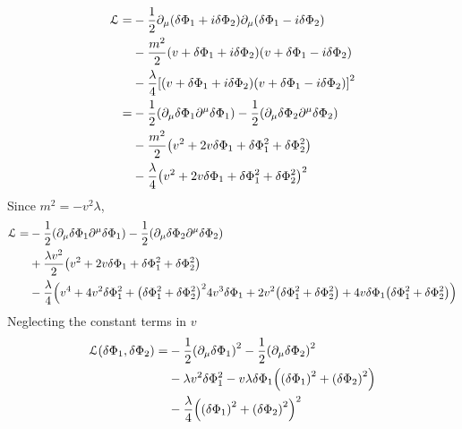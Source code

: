 \documentclass[../main/main.tex]{subfiles}
\begin{document}
\begin{equation}
\begin{split}
\mathcal{L}  = & - \frac{1}{2} \partial _ \mu \qty(\delta \Phi _1 + i \delta \Phi _2)   \partial _ \mu \qty(\delta \Phi _1 - i \delta \Phi _2)  \\
 & - \frac{m^2}{2} \qty(v + \delta \Phi _1 + i \delta \Phi _2) \qty(v + \delta \Phi _1 - i \delta \Phi _2) \\
 & - \frac{\lambda }{4} \qty[ \qty(v + \delta \Phi _1 + i \delta \Phi _2) \qty(v + \delta \Phi _1 - i \delta \Phi _2) ] ^2 \\
 =& - \frac{1}{2} \qty(\partial_ \mu  \delta \Phi _1 \partial^ \mu \delta \Phi _1  )
 - \frac{1}{2} \qty( \partial_ \mu  \delta \Phi _2 \partial^\mu \delta \Phi _2  )  \\
 & - \frac{m^2}{2} \qty(v^2 + 2 v \delta \Phi _1 + \delta \Phi _1^2 + \delta \Phi _2^2) \\
 &- \frac{\lambda }{4} \qty(v^2 + 2 v \delta \Phi _1 + \delta \Phi _1^2 + \delta \Phi _2 ^2)^2
\end{split}
\end{equation}
Since \( m^2 = - v^2 \lambda  \),
\begin{equation}
\begin{split}
\mathcal{L}   = &  - \frac{1}{2} \qty(\partial_ \mu  \delta \Phi _1 \partial^ \mu \delta \Phi _1  )
- \frac{1}{2} \qty( \partial_ \mu  \delta \Phi _2 \partial^ \mu \delta \Phi _2  ) \\
& + \frac{\lambda v^2}{2} \qty(v^2 + 2 v \delta \Phi _1 + \delta \Phi _1^2 + \delta \Phi _2^2)  \\
& - \frac{\lambda }{4} \qty(v^4 + 4 v^2 \delta \Phi _1^2 + \qty(\delta \Phi _1^2 + \delta \Phi _2^2)^2
    4 v^3 \delta \Phi _1 + 2 v^2 \qty(\delta \Phi _1^2 + \delta \Phi _2^2) + 4 v \delta \Phi _1 \qty(\delta \Phi _1^2 + \delta \Phi _2^2)   )
\end{split}
\end{equation}
Neglecting the constant terms in \( v \)
\begin{equation}
\begin{split}
\mathcal{L} \qty(\delta \Phi _1, \delta \Phi _2)   = &  - \frac{1}{2} \qty(\partial_ \mu  \delta \Phi _1 )^2 - \frac{1}{2} \qty(\partial_ \mu \delta \Phi _2 )^2    \\
& - \lambda v^2 \delta \Phi _1^2 - v \lambda \delta \Phi _1 \qty( \qty(\delta \Phi _1)^2 + \qty(\delta \Phi _2 )^2  ) \\
& - \frac{\lambda }{4} \qty( \qty(\delta \Phi _1)^2 + \qty(\delta \Phi _2)^2  )^2
\end{split}
\end{equation}
\end{document}

